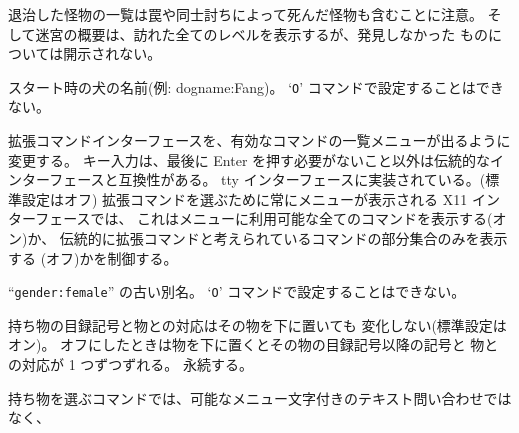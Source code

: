 退治した怪物の一覧は罠や同士討ちによって死んだ怪物も含むことに注意。
そして迷宮の概要は、訪れた全てのレベルを表示するが、発見しなかった
ものについては開示されない。
\item[\ib{dogname}]
スタート時の犬の名前(例: dogname:Fang)。
`{\tt O}' コマンドで設定することはできない。
\item[\ib{extmenu}]
拡張コマンドインターフェースを、有効なコマンドの一覧メニューが出るように変更する。
キー入力は、最後に Enter を押す必要がないこと以外は伝統的なインターフェースと互換性がある。
tty インターフェースに実装されている。(標準設定はオフ)
拡張コマンドを選ぶために常にメニューが表示される X11 インターフェースでは、
これはメニューに利用可能な全てのコマンドを表示する(オン)か、
伝統的に拡張コマンドと考えられているコマンドの部分集合のみを表示する
(オフ)かを制御する。
\item[\ib{female}]
``{\tt gender:female}'' の古い別名。
`{\tt O}' コマンドで設定することはできない。
\item[\ib{fixinv}]
持ち物の目録記号と物との対応はその物を下に置いても
変化しない(標準設定はオン)。
オフにしたときは物を下に置くとその物の目録記号以降の記号と
物との対応が 1 つずつずれる。
永続する。
\item[\ib{force\_invmenu}]
持ち物を選ぶコマンドでは、可能なメニュー文字付きのテキスト問い合わせではなく、

